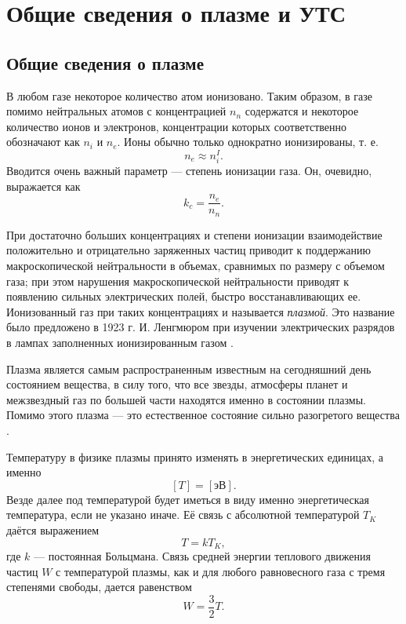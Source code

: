 
\chapter{Общие сведения о плазме и УТС} \label{Appendix0}

\section{Общие сведения о плазме}

В любом газе некоторое количество атом ионизовано. Таким образом, в газе помимо нейтральных атомов с концентрацией $n_n$ содержатся и некоторое количество ионов и электронов, концентрации которых соответственно обозначают как $n_i$ и $n_e$. Ионы обычно только однократно ионизированы, т. е.
\begin{equation}
n_e \approx n_i^I.
\end{equation}
Вводится очень важный параметр --- степень ионизации газа. Он, очевидно, выражается как
\begin{equation}
k_c = \frac{n_e}{n_n}.
\end{equation}

При достаточно больших концентрациях и степени ионизации взаимодействие положительно и отрицательно заряженных частиц приводит к поддержанию макроскопической нейтральности в объемах, сравнимых по размеру с объемом газа; при этом нарушения макроскопической нейтральности приводят к появлению сильных электрических полей, быстро восстанавливающих ее. Ионизованный газ при таких концентрациях и называется \textit{плазмой}. Это название было предложено в 1923 г. И. Ленгмюром при изучении электрических разрядов в лампах заполненных ионизированным газом \cite{golant,kotelnikov2008}.


Плазма является самым распространенным известным на сегодняшний день состоянием вещества, в силу того, что все звезды, атмосферы планет и межзвездный газ по большей части находятся именно в состоянии плазмы. Помимо этого плазма --- это естественное состояние сильно разогретого вещества \cite{golant,archenovich}.

Температуру в физике плазмы принято изменять в энергетических единицах, а именно
\begin{equation}
\left[T\right] = \left[\text{эВ}\right].
\end{equation}
Везде далее под температурой будет иметься в виду именно энергетическая температура, если не указано иначе. Её связь с абсолютной температурой $T_K$ даётся выражением
\begin{equation}
T = k T_K,
\end{equation}
где $k$ --- постоянная Больцмана. Связь средней энергии теплового движения частиц $W$ с температурой плазмы, как и для любого равновесного газа с тремя степенями свободы, дается равенством
\begin{equation}
W = \frac{3}{2} T.
\end{equation}

